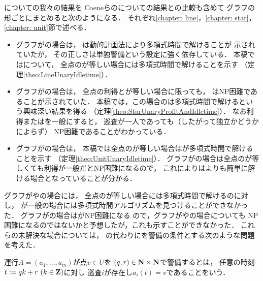 {\patProb}についての我々の結果を
Coeneらの{\independentPatProb}についての結果との比較も含めて
グラフの形ごとにまとめると次のようになる．
それぞれ\ref{chapter: line}，\ref{chapter: star}，\ref{chapter: unit}節で述べる．
\begin{itemize}
\item 
  グラフが{\graphLine}の場合は，
  {\independentPatProb}は動的計画法により多項式時間で解けることが
  示されていた\cite[Theorem~11]{coene2011charlemagne}が，
  その正しさは単独警備という設定に強く依存している．
  本稿では{\patProb}について，
  全点の{\maxIdletime}が等しい場合には多項式時間で解けることを示す
  （定理\ref{theo:LineUnaryIdletime}）．
\item
  グラフが{\graphStar}の場合は，
  全点の利得と{\maxIdletime}が等しい場合に限っても，
  {\independentPatProb}はNP困難であることが示されていた\cite[Theorem~10]{coene2011charlemagne}．
  本稿では，この場合の{\patProb}は多項式時間で解けるという興味深い結果を得る
  （定理\ref{theo:StarUnaryProfitAndIdletime}）．
  なお利得または{\maxIdletime}を一般にすると，
  巡査が一人であっても（したがって独立かどうかによらず）
  NP困難であることがわかっている\cite[Theorems 5 and 6]{coene2011charlemagne}．
\item 
  グラフが{\graphUnit}の場合は，
  本稿では全点の{\maxIdletime}が等しい場合は{\patProb}が多項式時間で解けることを示す
  （定理\ref{theo:UnitUnaryIdletime}）．
  グラフが{\graphStar}の場合は全点の{\maxIdletime}が等しくても利得が一般だとNP困難になるので，
  これにより{\graphUnit}は{\graphStar}よりも簡単に解ける場合となっていることが分かる．
\end{itemize}



グラフが{\graphLine}や{\graphUnit}の場合には，
全点の{\maxIdletime}が等しい場合には多項式時間で解けるのに対し，
{\maxIdletime}が一般の場合には多項式時間アルゴリズムを見つけることができなかった．
グラフが{\graphStar}の場合は{\patProb}がNP困難になる\cite{coene2011charlemagne}
ので，グラフが{\graphLine}や{\graphUnit}の場合についても
NP困難になるのではないかと予想したが，これも示すことができなかった．
これらの未解決な場合については，
{\maxIdletime}の代わりに{\exactIdletime}を警備の条件とする次のような問題を考えた．

\begin{defi}
  運行$A = (a _1, \ldots, a _m)$が点$v \in U$を
  {\exactIdletime}$(q, r) \in \mathbf N \times \mathbf N$で警備するとは，
  任意の時刻$t := q k + r\ (k \in \mathbf Z)$に対し
  巡査$i$が存在し$a _i (t) = v$であることをいう．
\end{defi}


